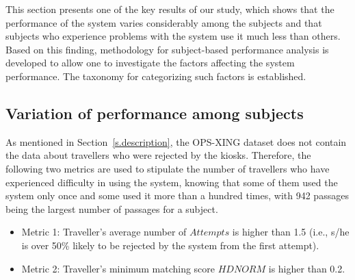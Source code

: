 \documentclass{cta-author}%
\begin{document}
This section presents one of the key results of our study, which shows that the performance of the system varies considerably among the subjects and that subjects who experience problems with the system use it much less than others. 
Based on this finding, methodology for subject-based performance analysis is developed to allow one to investigate the factors affecting the system performance. The taxonomy for categorizing such factors is established.

\subsection{Variation of performance among subjects}


As mentioned in Section~\ref{s.description}, the OPS-XING dataset does not contain the data about travellers who were rejected by the kiosks. 
Therefore, the following two metrics are used to
stipulate the number of travellers who have  experienced 
difficulty in using the system, 
knowing that some of them used the system only once and some used it more than a hundred times, with 942 passages being the largest number of passages for a subject.


\begin{itemize}
\item       Metric 1:  Traveller's  average number of $Attempts$  is higher than 1.5 (i.e., s/he is over 50\% likely to be rejected by the system from the first attempt).  
\item       Metric 2: Traveller's  minimum matching score $HDNORM$ is higher than 0.2.  
\end{itemize}
\end{document}
